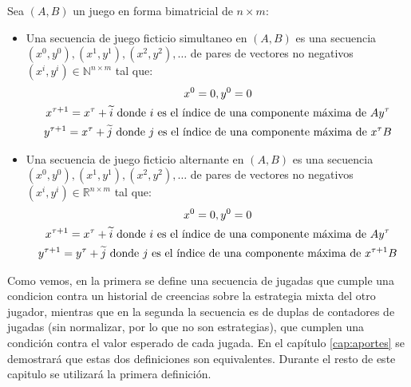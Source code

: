 \begin{definition} \label{def:fp:brandt}
    Sea $(A, B)$ un juego en forma bimatricial de $n \times m$:
    \begin{itemize}
        \item Una secuencia de juego ficticio simultaneo en $(A, B)$ es una secuencia $(x^0, y^0), (x^1, y^1), (x^2, y^2), \dots$ de pares de vectores no negativos $(x^i, y^i) \in \mathbb{N}^{n \times m}$ tal que:
        \begin{gather*}
            x^0 = \boldmath{0}, y^0 = \boldmath{0} \\
            x^{\tau+1} = x^{\tau} + \widetilde{i} \text{\ donde $i$ es el índice de una componente máxima de $Ay^\tau$} \\
            y^{\tau+1} = x^{\tau} + \widetilde{j} \text{\ donde $j$ es el índice de una componente máxima de $x^{\tau}B$}
        \end{gather*}
        \item Una secuencia de juego ficticio alternante en $(A, B)$ es una secuencia $(x^0, y^0), (x^1, y^1), (x^2, y^2), \dots$ de pares de vectores no negativos $(x^i, y^i) \in \mathbb{R}^{n \times m}$ tal que:
        \begin{gather*}
            x^0 = \boldmath{0}, y^0 = \boldmath{0} \\
            x^{\tau+1} = x^{\tau} + \widetilde{i} \text{\ donde $i$ es el índice de una componente máxima de $Ay^\tau$} \\
            y^{\tau+1} = y^{\tau} + \widetilde{j} \text{\ donde $j$ es el índice de una componente máxima de $x^{\tau+1}B$}
        \end{gather*}
    \end{itemize}
\end{definition}

Como vemos, en la primera se define una secuencia de jugadas que cumple una condicion contra un historial de creencias sobre la estrategia mixta del otro jugador, mientras que en la segunda la secuencia es de duplas de contadores de jugadas (sin normalizar, por lo que no son estrategias), que cumplen una condición contra el valor esperado de cada jugada. En el capítulo \ref{cap:aportes} se demostrará que estas dos definiciones son equivalentes. Durante el resto de este capitulo se utilizará la primera definición.





